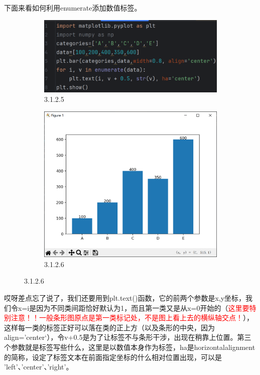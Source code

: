 \documentclass[12pt]{article}
\begin{document}
下面来看如何利用enumerate添加数值标签。
\begin{figure}[H]
    \centering
    \begin{subfigure}[b]{0.6\textwidth}
        \includegraphics[width=\textwidth]{enumerate program2.png} %
        \caption{3.1.2.5}
        \label{fig:line-graph2}
    \end{subfigure}
    \hfill
    \begin{subfigure}[b]{0.38\textwidth}
        \includegraphics[width=\textwidth]{enumerate Pic2.png} %
        \caption{3.1.2.6}
        \label{fig:line-graph2-pic2}
    \end{subfigure}
\end{figure}
哎呀差点忘了说了，我们还要用到plt.text()函数，它的前两个参数是x,y坐标，我们令x=i是因为不同类间距恰好默认为1，而且第一类又是从x=0开始的（\textcolor{red}{这里要特别注意！！一般条形图原点是第一类标记处，不是图上看上去的横纵轴交点！}），这样每一类的标签正好可以落在类的正上方（以及条形的中央，因为align=’center‘），令v+0.5是为了让标签不与条形干涉，出现在稍靠上位置。第三个参数就是标签写些什么，这里是以数值本身作为标签，ha是horizontalalignment的简称，设定了标签文本在前面指定坐标的什么相对位置出现，可以是 'left'、'center'、'right'。
\end{document}
